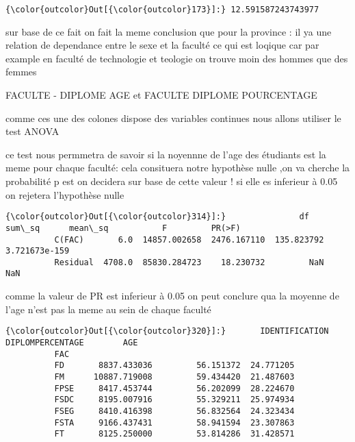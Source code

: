 \documentclass[11pt]{article}
\begin{document}
            \begin{Verbatim}[commandchars=\\\{\}]
{\color{outcolor}Out[{\color{outcolor}173}]:} 12.591587243743977
\end{Verbatim}
        
    sur base de ce fait on fait la meme conclusion que pour la province : il
ya une relation de dependance entre le sexe et la faculté ce qui est
loqique car par example en faculté de technologie et teologie on trouve
moin des hommes que des femmes

    FACULTE - DIPLOME AGE et FACULTE DIPLOME POURCENTAGE

    comme ces une des colones dispose des variables continues nous allons
utiliser le test ANOVA

    ce test nous permmetra de savoir si la noyennne de l'age des étudiants
est la meme pour chaque faculté: cela consituera notre hypothèse nulle
,on va cherche la probabilité p est on decidera sur base de cette valeur
! si elle es inferieur à 0.05 on rejetera l'hypothèse nulle

            \begin{Verbatim}[commandchars=\\\{\}]
{\color{outcolor}Out[{\color{outcolor}314}]:}               df        sum\_sq      mean\_sq           F         PR(>F)
          C(FAC)       6.0  14857.002658  2476.167110  135.823792  3.721673e-159
          Residual  4708.0  85830.284723    18.230732         NaN            NaN
\end{Verbatim}
        
    comme la valeur de PR est inferieur à 0.05 on peut conclure qua la
moyenne de l'age n'est pas la meme au sein de chaque faculté

            \begin{Verbatim}[commandchars=\\\{\}]
{\color{outcolor}Out[{\color{outcolor}320}]:}       IDENTIFICATION  DIPLOMPERCENTAGE        AGE
          FAC                                              
          FD       8837.433036         56.151372  24.771205
          FM      10887.719008         59.434420  21.487603
          FPSE     8417.453744         56.202099  28.224670
          FSDC     8195.007916         55.329211  25.974934
          FSEG     8410.416398         56.832564  24.323434
          FSTA     9166.437431         58.941594  23.307863
          FT       8125.250000         53.814286  31.428571
\end{Verbatim}
        
\end{document}

